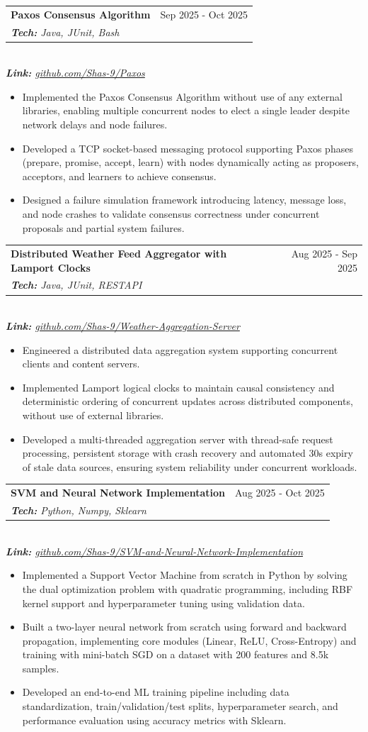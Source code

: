 \documentclass[letterpaper,11pt]{article}
\makeatletter
\newcommand{\resumeItem}[1]{
  \item\small{
    {#1 \vspace{-2pt}}
  }
}
\newcommand{\resumeSubheading}[4]{
  \vspace{0pt}\item
    \begin{tabular*}{0.97\textwidth}[t]{l@{\extracolsep{\fill}}r}
      \textbf{#1} & #2 \\
      \textit{\small#3} %
    \end{tabular*} %
    \textit{\small #4}
    \vspace{-7pt}
}
\newcommand{\resumeItemListStart}{\begin{itemize}[leftmargin=0.14in]}
\newcommand{\resumeItemListEnd}{\end{itemize}\vspace{-8pt}}
\makeatother
\begin{document}
    \resumeSubheading{\textbf{Paxos Consensus Algorithm}}{\small Sep 2025 - Oct 2025}
    {\textbf{\emph{Tech:}} Java, JUnit, Bash}
    {\\ \textbf{\emph{Link:}} \href{https://github.com/Shas-9/Paxos}{github.com/Shas-9/Paxos}}
    \resumeItemListStart
        \resumeItem{Implemented the Paxos Consensus Algorithm without use of any external libraries, enabling multiple concurrent nodes to elect a single leader despite network delays and node failures.}
        \resumeItem{Developed a TCP socket-based messaging protocol supporting Paxos phases (prepare, promise, accept, learn) with nodes dynamically acting as proposers, acceptors, and learners to achieve consensus.}
        \resumeItem{Designed a failure simulation framework introducing latency, message loss, and node crashes to validate consensus correctness under concurrent proposals and partial system failures.}
    \resumeItemListEnd

    \resumeSubheading{\textbf{Distributed Weather Feed Aggregator with Lamport Clocks}}{\small Aug 2025 - Sep 2025}
    {\textbf{\emph{Tech:}} Java, JUnit, RESTAPI}
    {\\ \textbf{\emph{Link:}} \href{https://github.com/Shas-9/Weather-Aggregation-Server}{github.com/Shas-9/Weather-Aggregation-Server}}
    \resumeItemListStart
        \resumeItem{Engineered a distributed data aggregation system supporting concurrent clients and content servers.}
        \resumeItem{Implemented Lamport logical clocks to maintain causal consistency and deterministic ordering of concurrent updates across distributed components, without use of external libraries.}
        \resumeItem{Developed a multi-threaded aggregation server with thread-safe request processing, persistent storage with crash recovery and automated 30s expiry of stale data sources, ensuring system reliability under concurrent workloads.}
    \resumeItemListEnd

    \resumeSubheading{\textbf{SVM and Neural Network Implementation}}{\small Aug 2025 - Oct 2025}
    {\textbf{\emph{Tech:}} Python, Numpy, Sklearn}
    {\\ \textbf{\emph{Link:}} \href{https://github.com/Shas-9/SVM-and-Neural-Network-Implementation}{github.com/Shas-9/SVM-and-Neural-Network-Implementation}}
    \resumeItemListStart
        \resumeItem{Implemented a Support Vector Machine from scratch in Python by solving the dual optimization problem with quadratic programming, including RBF kernel support and hyperparameter tuning using validation data.}
        \resumeItem{Built a two-layer neural network from scratch using forward and backward propagation, implementing core modules (Linear, ReLU, Cross-Entropy) and training with mini-batch SGD on a dataset with 200 features and 8.5k samples.}
        \resumeItem{Developed an end-to-end ML training pipeline including data standardization, train/validation/test splits, hyperparameter search, and performance evaluation using accuracy metrics with Sklearn.}
    \resumeItemListEnd
    
\end{document}
